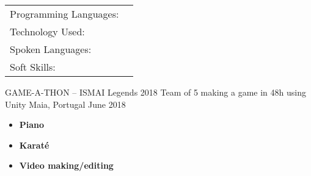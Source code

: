 \documentclass[]{awesome-cv}
\begin{document}
\vspace{-2mm}
\begin{cventries}
	\vspace{-2mm}
	\cventry
	{}
	{\def\arraystretch{1.15}{\begin{tabular}{ l l }
		Programming Languages:  & {\skill{ Java, JavaScript, C\#, PROLOG }} \\
		Technology Used:  & {\skill{ Angular, Node.js, .NET Core, Jira, Git, SonarQube, Jenkins, Oracle, Maven}} \\
		Spoken Languages:  & {\skill{ English, Portuguese, French, Spanish}} \\
		Soft Skills:  & {\skill{ Team work, Self-motivation, Creativity, Good communication}} \\
		\end{tabular}}}
	{}
	{}
	{}
\end{cventries}

\vspace{-2mm}
\begin{cvhonors}
	\cvhonor
	{GAME-A-THON – ISMAI Legends 2018}
	{Team of 5 making a game in 48h using Unity}
	{Maia, Portugal}
	{June 2018}
\end{cvhonors}

\begin{itemize}
	\item \textbf{Piano} 
	\item \textbf{Karaté} 
	\item \textbf{Video making/editing} 

\end{itemize}

\
\end{document}
